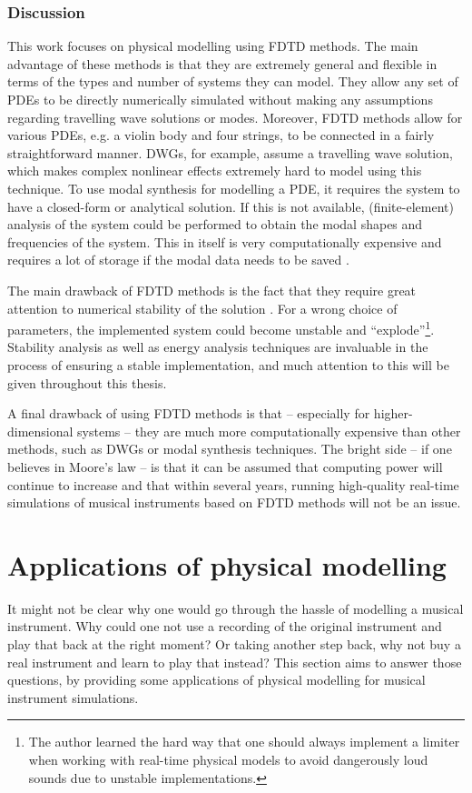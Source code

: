 \subsubsection{Discussion}
This work focuses on physical modelling using FDTD methods. The main advantage of these methods is that they are extremely general and flexible in terms of the types and number of systems they can model. They allow any set of PDEs to be directly numerically simulated without making any assumptions regarding travelling wave solutions or modes. Moreover, FDTD methods allow for various PDEs, e.g. a violin body and four strings, to be connected in a fairly straightforward manner. DWGs, for example, assume a travelling wave solution, which makes complex nonlinear effects extremely hard to model using this technique. To use modal synthesis for modelling a PDE, it requires the system to have a closed-form or analytical solution. If this is not available, (finite-element) analysis of the system could be performed to obtain the modal shapes and frequencies of the system. This in itself is very computationally expensive and requires a lot of storage if the modal data needs to be saved \cite{Bilbao2019CMJa}.
 
The main drawback of FDTD methods is the fact that they require great attention to numerical stability of the solution \cite{theBible}. For a wrong choice of parameters, the implemented system could become unstable and ``explode''\footnote{The author learned the hard way that one should always implement a limiter when working with real-time physical models to avoid dangerously loud sounds due to unstable implementations.}. Stability analysis as well as energy analysis techniques are invaluable in the process of ensuring a stable implementation, and much attention to this will be given throughout this thesis.

A final drawback of using FDTD methods is that -- especially for higher-dimensional systems -- they are much more computationally expensive than other methods, such as DWGs or modal synthesis techniques. The bright side -- if one believes in Moore's law \cite{Moore1965} -- is that it can be assumed that computing power will continue to increase and that within several years, running high-quality real-time simulations of musical instruments based on FDTD methods will not be an issue.

\section{Applications of physical modelling}\label{sec:why}
It might not be clear why one would go through the hassle of modelling a musical instrument. Why could one not use a recording of the original instrument and play that back at the right moment? Or taking another step back, why not buy a real instrument and learn to play that instead? This section aims to answer those questions, by providing some applications of physical modelling for musical instrument simulations.

